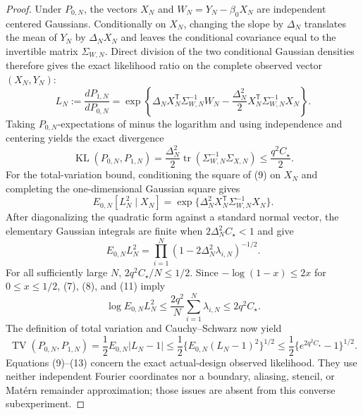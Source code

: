 \documentclass{article}
\begin{document}
\begin{proof}
Under \(P_{0,N}\), the vectors \(X_N\) and \(W_N=Y_N-\beta_0X_N\) are independent centered Gaussians.  Conditionally on \(X_N\), changing the slope by \(\Delta_N\) translates the mean of \(Y_N\) by \(\Delta_NX_N\) and leaves the conditional covariance equal to the invertible matrix \(\Sigma_{W,N}\).  Direct division of the two conditional Gaussian densities therefore gives the exact likelihood ratio on the complete observed vector \((X_N,Y_N)\):
\[
 L_N:=\frac{dP_{1,N}}{dP_{0,N}}
 =\exp\left\{\Delta_NX_N^{\mathsf T}\Sigma_{W,N}^{-1}W_N
 -\frac{\Delta_N^2}{2}X_N^{\mathsf T}\Sigma_{W,N}^{-1}X_N\right\}.
 \tag{9}
\]
Taking \(P_{0,N}\)-expectations of minus the logarithm and using independence and centering yields the exact divergence
\[
 \operatorname{KL}(P_{0,N},P_{1,N})
 =\frac{\Delta_N^2}{2}
 \operatorname{tr}(\Sigma_{W,N}^{-1}\Sigma_{X,N})
 \leq\frac{q^2C_\star}{2}.
 \tag{10}
\]
For the total-variation bound, conditioning the square of (9) on \(X_N\) and completing the one-dimensional Gaussian square gives
\[
 E_{0,N}[L_N^2\mid X_N]
 =\exp\{\Delta_N^2X_N^{\mathsf T}\Sigma_{W,N}^{-1}X_N\}.
\]
After diagonalizing the quadratic form against a standard normal vector, the elementary Gaussian integrals are finite when \(2\Delta_N^2C_\star<1\) and give
\[
 E_{0,N}L_N^2
 =\prod_{i=1}^N(1-2\Delta_N^2\lambda_{i,N})^{-1/2}.
 \tag{11}
\]
For all sufficiently large \(N\), \(2q^2C_\star/N\leq1/2\).  Since \(-\log(1-x)\leq2x\) for \(0\leq x\leq1/2\), (7), (8), and (11) imply
\[
 \log E_{0,N}L_N^2
 \leq\frac{2q^2}{N}\sum_{i=1}^N\lambda_{i,N}
 \leq2q^2C_\star.
 \tag{12}
\]
The definition of total variation and Cauchy--Schwarz now yield
\[
 \operatorname{TV}(P_{0,N},P_{1,N})
 =\frac12E_{0,N}|L_N-1|
 \leq\frac12\{E_{0,N}(L_N-1)^2\}^{1/2}
 \leq\frac12\{e^{2q^2C_\star}-1\}^{1/2}.
 \tag{13}
\]
Equations (9)--(13) concern the exact actual-design observed likelihood.  They use neither independent Fourier coordinates nor a boundary, aliasing, stencil, or Mat\'ern remainder approximation; those issues are absent from this converse subexperiment.


\end{proof}
\end{document}
